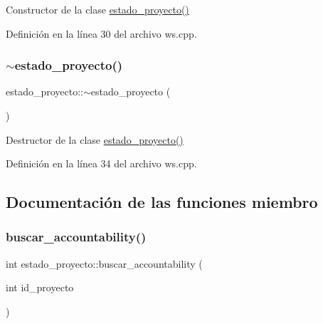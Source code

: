 Constructor de la clase \hyperlink{classestado__proyecto_a4a6b71e81903d4b3b729acbfc5b4eef8}{estado\+\_\+proyecto()} 



Definición en la línea 30 del archivo ws.\+cpp.

\hypertarget{classestado__proyecto_afd91dfa4205c3c3af3f7af6e6744c711}{}\label{classestado__proyecto_afd91dfa4205c3c3af3f7af6e6744c711} 
\subsubsection{\texorpdfstring{$\sim$estado\+\_\+proyecto()}{~estado\_proyecto()}}
{\footnotesize\ttfamily estado\+\_\+proyecto\+::$\sim$estado\+\_\+proyecto (\begin{DoxyParamCaption}{ }\end{DoxyParamCaption})}



Destructor de la clase \hyperlink{classestado__proyecto_a4a6b71e81903d4b3b729acbfc5b4eef8}{estado\+\_\+proyecto()} 



Definición en la línea 34 del archivo ws.\+cpp.



\subsection{Documentación de las funciones miembro}
\hypertarget{classestado__proyecto_a3029c517ed772189246c0469e58f6012}{}\label{classestado__proyecto_a3029c517ed772189246c0469e58f6012} 
\subsubsection{\texorpdfstring{buscar\+\_\+accountability()}{buscar\_accountability()}}
{\footnotesize\ttfamily int estado\+\_\+proyecto\+::buscar\+\_\+accountability (\begin{DoxyParamCaption}\item[{int}]{id\+\_\+proyecto }\end{DoxyParamCaption})}



